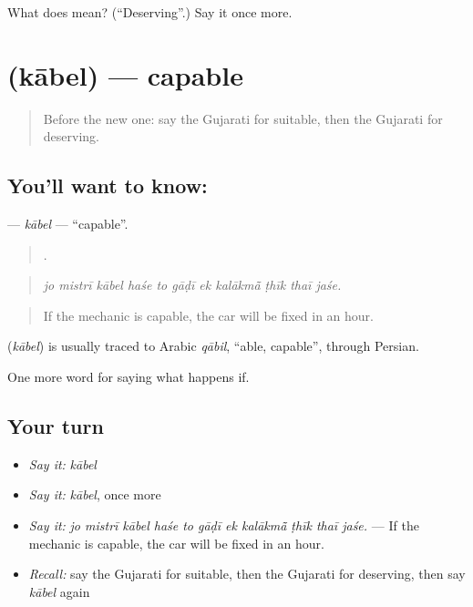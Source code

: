\begin{tcolorbox}[breakable,colback=teal!4,colframe=teal!35!black,title={Before you move on}]
What does  mean? (\textquotedblleft{}Deserving\textquotedblright{}.) Say it once more.
\end{tcolorbox}
\section[\texorpdfstring{\gu{કાબેલ} (kābel)}{કાબેલ (kābel)}]{ (kābel) — capable}

\label{lesson:GU-C543-kabel}



\begin{quote}
Before the new one: say the Gujarati for suitable, then the Gujarati for deserving.
\end{quote}

\subsection*{You'll want to know: }
\textbf{} — \emph{kābel} — \textquotedblleft{}capable\textquotedblright{}.

\begin{quote}
          .
\end{quote}

\begin{quote}
\emph{jo mistrī kābel haśe to gāḍī ek kalākmā̃ ṭhīk thaī jaśe.}
\end{quote}

\begin{quote}
If the mechanic is capable, the car will be fixed in an hour.
\end{quote}

\begin{cousinweb}
\textbf{} (\emph{kābel}) is usually traced to Arabic \emph{qābil}, \textquotedblleft{}able, capable\textquotedblright{}, through Persian.
\end{cousinweb}

\begin{grammarlens}[title={What you've built}]
One more word for saying what happens if.
\end{grammarlens}

\subsection*{Your turn}
\begin{itemize}
\raggedright
  \item \emph{Say it:} \emph{kābel}
  \item \emph{Say it:} \emph{kābel}, once more
  \item \emph{Say it:} \emph{jo mistrī kābel haśe to gāḍī ek kalākmā̃ ṭhīk thaī jaśe.} — If the mechanic is capable, the car will be fixed in an hour.
  \item \emph{Recall:} say the Gujarati for suitable, then the Gujarati for deserving, then say \emph{kābel} again
\end{itemize}

